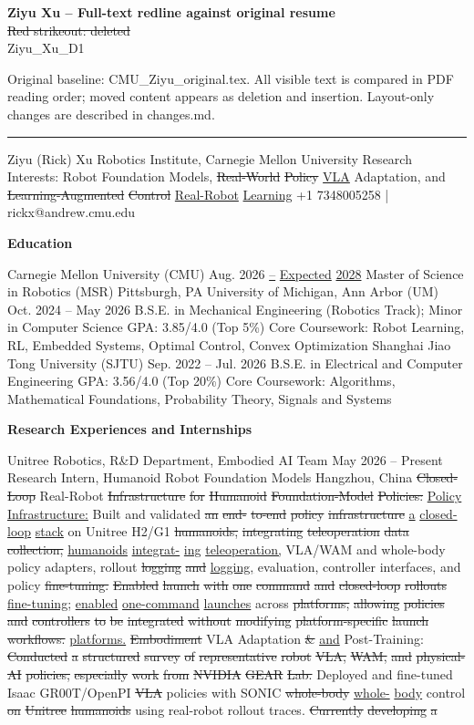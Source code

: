 \documentclass[10pt,letterpaper]{article}
\newcommand{\del}[1]{{\color{red}\sout{#1}}}
\newcommand{\add}[1]{{\color{blue}\uline{#1}}}
\begin{document}
\textbf{Ziyu Xu -- Full-text redline against original resume}\\
\del{Red strikeout: deleted} \quad \add{Blue underline: added}\\
Ziyu\_Xu\_D1\par
Original baseline: CMU\_Ziyu\_original.tex. All visible text is compared in PDF reading order; moved content appears as deletion and insertion. Layout-only changes are described in changes.md.
\hrule\medskip
Ziyu (Rick) Xu Robotics Institute, Carnegie Mellon University Research Interests: Robot Foundation Models, \del{Real-World} \del{Policy} \add{VLA} Adaptation, and \del{Learning-Augmented} \del{Control} \add{Real-Robot} \add{Learning} +1 7348005258 | rickx@andrew.cmu.edu \par\medskip\textbf{Education}\par  Carnegie Mellon University (CMU) Aug. 2026 \add{--} \add{Expected} \add{2028} Master of Science in Robotics (MSR) Pittsburgh, PA University of Michigan, Ann Arbor (UM) Oct. 2024 -- May 2026 B.S.E. in Mechanical Engineering (Robotics Track); Minor in Computer Science GPA: 3.85/4.0 (Top 5\%)  Core Coursework: Robot Learning, RL, Embedded Systems, Optimal Control, Convex Optimization Shanghai Jiao Tong University (SJTU) Sep. 2022 -- Jul. 2026 B.S.E. in Electrical and Computer Engineering GPA: 3.56/4.0 (Top 20\%)  Core Coursework: Algorithms, Mathematical Foundations, Probability Theory, Signals and Systems \par\medskip\textbf{Research Experiences and Internships}\par  Unitree Robotics, R\&D Department, Embodied AI Team May 2026 -- Present Research Intern, Humanoid Robot Foundation Models Hangzhou, China  \del{Closed-Loop} Real-Robot \del{Infrastructure} \del{for} \del{Humanoid} \del{Foundation-Model} \del{Policies:} \add{Policy} \add{Infrastructure:} Built and validated \del{an} \del{end-} \del{to-end} \del{policy} \del{infrastructure} \add{a} \add{closed-loop} \add{stack} on Unitree H2/G1 \del{humanoids,} \del{integrating} \del{teleoperation} \del{data} \del{collection,} \add{humanoids} \add{integrat-} \add{ing} \add{teleoperation,} VLA/WAM and whole-body policy adapters, rollout \del{logging} \del{and} \add{logging,} evaluation, controller interfaces, and policy \del{fine-tuning.} \del{Enabled} \del{launch} \del{with} \del{one} \del{command} \del{and} \del{closed-loop} \del{rollouts} \add{fine-tuning;} \add{enabled} \add{one-command} \add{launches} across \del{platforms,} \del{allowing} \del{policies} \del{and} \del{controllers} \del{to} \del{be} \del{integrated} \del{without} \del{modifying} \del{platform-specific} \del{launch} \del{workflows.} \add{platforms.}  \del{Embodiment} VLA Adaptation \del{\&} \add{and} Post-Training: \del{Conducted} \del{a} \del{structured} \del{survey} \del{of} \del{representative} \del{robot} \del{VLA,} \del{WAM,} \del{and} \del{physical-AI} \del{policies,} \del{especially} \del{work} \del{from} \del{NVIDIA} \del{GEAR} \del{Lab.} Deployed and fine-tuned Isaac GR00T/OpenPI \del{VLA} policies with SONIC \del{whole-body} \add{whole-} \add{body} control \del{on} \del{Unitree} \del{humanoids} using real-robot rollout traces. \del{Currently} \del{developing} \del{a} 
\end{document}
